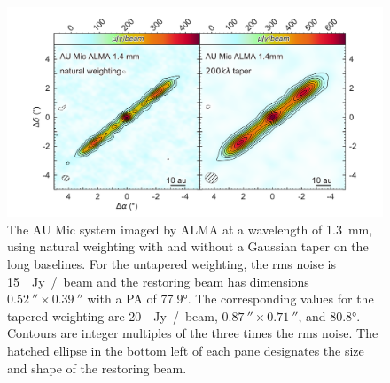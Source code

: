 \documentclass[12pt,oneside]{book}
\begin{document}
\begin{figure}[t]
  \includegraphics[width=\linewidth]{../figures/aumic_imaged}
  \caption{The AU Mic system imaged by ALMA at a wavelength of \SI{1.3}{mm}, using natural weighting with and without a Gaussian taper on the long baselines. 
  For the untapered weighting, the rms noise is \SI{15}{\mu Jy / beam} and the restoring beam has dimensions $\SI{0.52}{\arcsecond} \times \SI{0.39}{\arcsecond}$ with a PA of \ang[angle-symbol-over-decimal]{77.9}.
  The corresponding values for the tapered weighting are \SI{20}{\mu Jy / beam}, $\SI{0.87}{\arcsecond} \times \SI{0.71}{\arcsecond}$, and \ang[angle-symbol-over-decimal]{80.8}. 
  Contours are integer multiples of the three times the rms noise.
  The hatched ellipse in the bottom left of each pane designates the size and shape of the restoring beam.
  }
  \label{fig: aumic_imaged}
\end{figure}
\end{document}
